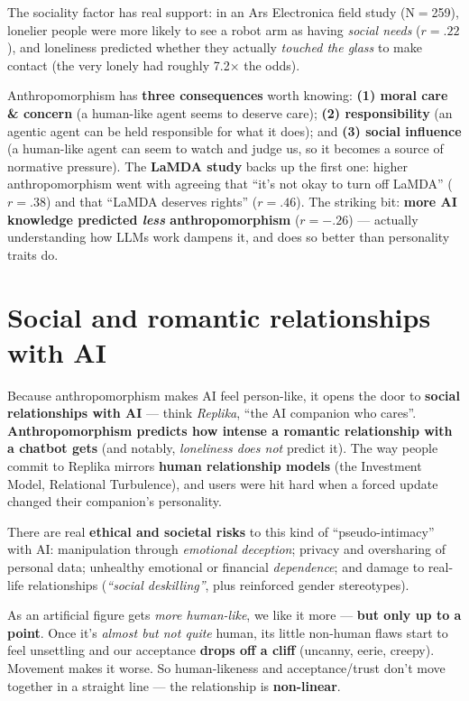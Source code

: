 \documentclass[11pt, oneside]{book}
\begin{document}
The sociality factor has real support: in an Ars Electronica field study
(N$=$259), lonelier people were more likely to see a robot arm as having
\emph{social needs} ($r=.22$), and loneliness predicted whether they actually
\emph{touched the glass} to make contact (the very lonely had roughly
7.2$\times$ the odds).

Anthropomorphism has \textbf{three consequences} worth knowing: \textbf{(1)
moral care \& concern} (a human-like agent seems to deserve care); \textbf{(2)
responsibility} (an agentic agent can be held responsible for what it does);
and \textbf{(3) social influence} (a human-like agent can seem to watch and
judge us, so it becomes a source of normative pressure). The \textbf{LaMDA
study} backs up the first one: higher anthropomorphism went with agreeing that
``it's not okay to turn off LaMDA'' ($r=.38$) and that ``LaMDA deserves
rights'' ($r=.46$). The striking bit: \textbf{more AI knowledge predicted
\emph{less} anthropomorphism} ($r=-.26$) — actually understanding how LLMs work
dampens it, and does so better than personality traits do.

\section{Social and romantic relationships with AI}

Because anthropomorphism makes AI feel person-like, it opens the door to
\textbf{social relationships with AI} — think \emph{Replika}, ``the AI
companion who cares''. \textbf{Anthropomorphism predicts how intense a romantic
relationship with a chatbot gets} (and notably, \emph{loneliness does not}
predict it). The way people commit to Replika mirrors \textbf{human
relationship models} (the Investment Model, Relational Turbulence), and users
were hit hard when a forced update changed their companion's personality.

There are real \textbf{ethical and societal risks} to this kind of
``pseudo-intimacy'' with AI: manipulation through \emph{emotional deception};
privacy and oversharing of personal data; unhealthy emotional or financial
\emph{dependence}; and damage to real-life relationships (\emph{``social
deskilling''}, plus reinforced gender stereotypes).

\begin{notebox}[title={The Uncanny Valley (Mori)}]
As an artificial figure gets \emph{more human-like}, we like it more —
\textbf{but only up to a point}. Once it's \emph{almost but not quite} human,
its little non-human flaws start to feel unsettling and our acceptance
\textbf{drops off a cliff} (uncanny, eerie, creepy). Movement makes it worse.
So human-likeness and acceptance/trust don't move together in a straight line
— the relationship is \textbf{non-linear}.
\end{notebox}
\end{document}
